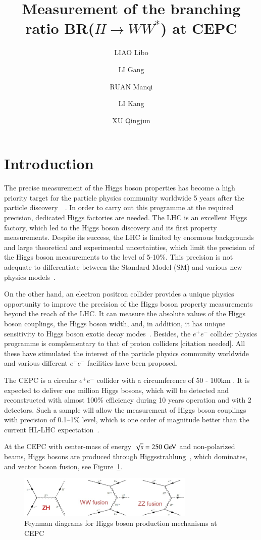 \documentclass[11pt,a4paper]{cepcnote}
\title{ Measurement of the branching ratio BR($H\rightarrow WW^*$) at CEPC }
\author[a,b]{LIAO Libo}
\author[b]{LI Gang}
\author[b]{RUAN Manqi}
\author[a]{LI Kang}
\author[a]{XU Qingjun}
\affil[a]{Hangzhou Normal University}
\affil[b]{Institute of High Energy Physics}
\begin{document}
\tableofcontents
\clearpage

\section{Introduction}
The precise measurement of the Higgs boson properties has become a high priority target for the particle physics community 
worldwide 5 years after the particle discovery~\cite{Aad:2012tfa}~\cite{Chatrchyan:2012xdj}. In order to carry out this programme
at the required precision, dedicated Higgs factories are needed.
The LHC is an excellent Higgs factory, which led to the Higgs boson discovery
and its first property measurements. Despite its success, the LHC is limited 
by enormous backgrounds and large theoretical and experimental uncertainties, 
which limit the precision of the Higgs boson measurements to the level of
5-10\%. This precision is not adequate to differentiate between the 
Standard Model (SM) and various new physics models~\cite{Martin:1997ns}.

On the other hand, an electron positron collider provides a unique physics 
opportunity to improve the precision of the Higgs boson property measurements 
beyond the reach of the LHC. It can measure the absolute values of the Higgs 
boson couplings, the Higgs boson width, and, in addition, it has unique 
sensitivity to Higgs boson exotic decay modes~\cite{Curtin:2013fra}. Besides, the $e^+e^-$ collider 
physics programme is complementary to that of proton colliders {\color{red}[citation needed]}. All these have
stimulated the interest of the particle physics community worldwide and
various different $e^+e^-$ facilities have been proposed. 

The CEPC is a circular $e^+e^-$ collider with a circumference of 50 - 100km \cite{CEPC-SPPCStudyGroup:2015csa}. It is expected to deliver one million 
Higgs bosons, which will be detected and reconstructed with almost 100\% efficiency during 10 years operation and with 2 detectors. Such a sample will  
allow the measurement of Higgs boson couplings with precision of 0.1--1\% level, which is one order of magnitude better than the current HL-LHC expectation~\cite{Cakir:2014nba}. 

At the CEPC with center-mass of energy $\sqrt s = 250\gev$ and 
non-polarized beams, Higgs bosons are produced through  Higgsstrahlung~\cite{Chen:2016zpw}, 
which dominates, and vector boson fusion, see  Figure~\ref{fig:fmd}.
\begin{figure}[H]
\begin{center}
\includegraphics[width=0.75\textwidth]{FMD}
\caption[]{Feynman diagrams for Higgs boson production mechanisms at CEPC}
\label{fig:fmd}
\end{center}
\end{figure}
\end{document}
